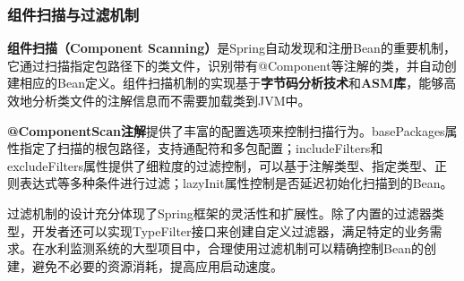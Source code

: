 \subsubsection{组件扫描与过滤机制}\label{ux7ec4ux4ef6ux626bux63cfux4e0eux8fc7ux6ee4ux673aux5236}

\textbf{组件扫描（Component Scanning）}是Spring自动发现和注册Bean的重要机制，它通过扫描指定包路径下的类文件，识别带有@Component等注解的类，并自动创建相应的Bean定义。组件扫描机制的实现基于\textbf{字节码分析技术}和\textbf{ASM库}，能够高效地分析类文件的注解信息而不需要加载类到JVM中。

\textbf{@ComponentScan注解}提供了丰富的配置选项来控制扫描行为。basePackages属性指定了扫描的根包路径，支持通配符和多包配置；includeFilters和excludeFilters属性提供了细粒度的过滤控制，可以基于注解类型、指定类型、正则表达式等多种条件进行过滤；lazyInit属性控制是否延迟初始化扫描到的Bean。

过滤机制的设计充分体现了Spring框架的灵活性和扩展性。除了内置的过滤器类型，开发者还可以实现TypeFilter接口来创建自定义过滤器，满足特定的业务需求。在水利监测系统的大型项目中，合理使用过滤机制可以精确控制Bean的创建，避免不必要的资源消耗，提高应用启动速度。

